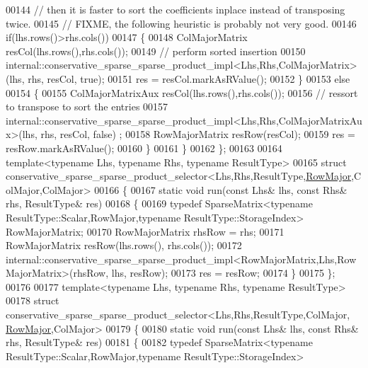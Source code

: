 \begin{DoxyCode}
00144     \textcolor{comment}{// then it is faster to sort the coefficients inplace instead of transposing twice.}
00145     \textcolor{comment}{// FIXME, the following heuristic is probably not very good.}
00146     \textcolor{keywordflow}{if}(lhs.rows()>rhs.cols())
00147     \{
00148       ColMajorMatrix resCol(lhs.rows(),rhs.cols());
00149       \textcolor{comment}{// perform sorted insertion}
00150       internal::conservative\_sparse\_sparse\_product\_impl<Lhs,Rhs,ColMajorMatrix>(lhs, rhs, resCol, \textcolor{keyword}{true});
00151       res = resCol.markAsRValue();
00152     \}
00153     \textcolor{keywordflow}{else}
00154     \{
00155       ColMajorMatrixAux resCol(lhs.rows(),rhs.cols());
00156       \textcolor{comment}{// ressort to transpose to sort the entries}
00157       internal::conservative\_sparse\_sparse\_product\_impl<Lhs,Rhs,ColMajorMatrixAux>(lhs, rhs, resCol, \textcolor{keyword}{false})
      ;
00158       RowMajorMatrix resRow(resCol);
00159       res = resRow.markAsRValue();
00160     \}
00161   \}
00162 \};
00163 
00164 \textcolor{keyword}{template}<\textcolor{keyword}{typename} Lhs, \textcolor{keyword}{typename} Rhs, \textcolor{keyword}{typename} ResultType>
00165 \textcolor{keyword}{struct }conservative\_sparse\_sparse\_product\_selector<Lhs,Rhs,ResultType,\hyperlink{group__enums_ggaacded1a18ae58b0f554751f6cdf9eb13acfcde9cd8677c5f7caf6bd603666aae3}{RowMajor},ColMajor,ColMajor>
00166 \{
00167   \textcolor{keyword}{static} \textcolor{keywordtype}{void} run(\textcolor{keyword}{const} Lhs& lhs, \textcolor{keyword}{const} Rhs& rhs, ResultType& res)
00168   \{
00169      \textcolor{keyword}{typedef} SparseMatrix<typename ResultType::Scalar,RowMajor,typename ResultType::StorageIndex> 
      RowMajorMatrix;
00170      RowMajorMatrix rhsRow = rhs;
00171      RowMajorMatrix resRow(lhs.rows(), rhs.cols());
00172      internal::conservative\_sparse\_sparse\_product\_impl<RowMajorMatrix,Lhs,RowMajorMatrix>(rhsRow, lhs, 
      resRow);
00173      res = resRow;
00174   \}
00175 \};
00176 
00177 \textcolor{keyword}{template}<\textcolor{keyword}{typename} Lhs, \textcolor{keyword}{typename} Rhs, \textcolor{keyword}{typename} ResultType>
00178 \textcolor{keyword}{struct }conservative\_sparse\_sparse\_product\_selector<Lhs,Rhs,ResultType,ColMajor,
      \hyperlink{group__enums_ggaacded1a18ae58b0f554751f6cdf9eb13acfcde9cd8677c5f7caf6bd603666aae3}{RowMajor},ColMajor>
00179 \{
00180   \textcolor{keyword}{static} \textcolor{keywordtype}{void} run(\textcolor{keyword}{const} Lhs& lhs, \textcolor{keyword}{const} Rhs& rhs, ResultType& res)
00181   \{
00182     \textcolor{keyword}{typedef} SparseMatrix<typename ResultType::Scalar,RowMajor,typename ResultType::StorageIndex> 

\end{DoxyCode}
